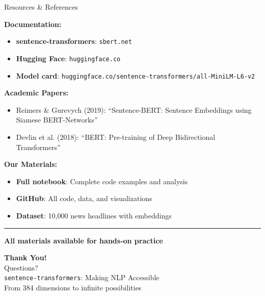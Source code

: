 \documentclass[8pt,aspectratio=169]{beamer}
\newcommand{\bottomnote}[1]{%
\vfill
\vspace{-2mm}
\textcolor{mllavender2}{\rule{\textwidth}{0.4pt}}
\vspace{1mm}
\footnotesize
\textbf{#1}
}
\begin{document}
\begin{frame}[t]{Resources \& References}

\textbf{Documentation:}
\begin{itemize}
    \item \textbf{sentence-transformers}: \texttt{sbert.net}
    \item \textbf{Hugging Face}: \texttt{huggingface.co}
    \item \textbf{Model card}: \texttt{huggingface.co/sentence-transformers/all-MiniLM-L6-v2}
\end{itemize}

\vspace{0.5cm}

\textbf{Academic Papers:}
\begin{itemize}
    \item Reimers \& Gurevych (2019): ``Sentence-BERT: Sentence Embeddings using Siamese BERT-Networks''
    \item Devlin et al. (2018): ``BERT: Pre-training of Deep Bidirectional Transformers''
\end{itemize}

\vspace{0.5cm}

\textbf{Our Materials:}
\begin{itemize}
    \item \textbf{Full notebook}: Complete code examples and analysis
    \item \textbf{GitHub}: All code, data, and visualizations
    \item \textbf{Dataset}: 10,000 news headlines with embeddings
\end{itemize}

\bottomnote{All materials available for hands-on practice}
\end{frame}

\begin{frame}[plain]
\vspace{3cm}
\begin{center}
{\Huge\textbf{Thank You!}}\\[1cm]
{\Large Questions?}\\[2cm]
{\normalsize\texttt{sentence-transformers}: Making NLP Accessible}\\[0.3cm]
{\normalsize From 384 dimensions to infinite possibilities}
\end{center}
\end{frame}
\end{document}

